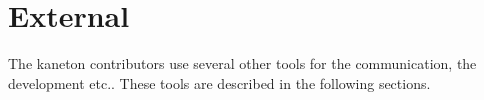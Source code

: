 

%
%

\section{External}

The kaneton contributors use several other tools for the communication, the
development etc.. These tools are described in the following sections.












